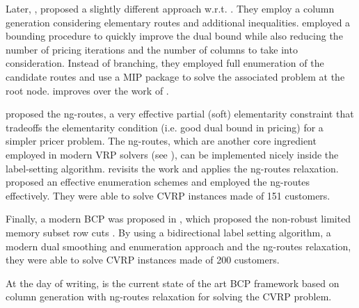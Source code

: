 Later, \textcite{baldacci2008}, proposed a slightly different approach w.r.t. \citeauthor{fukasawa2006}.
They employ a column generation considering elementary routes and additional inequalities.
\citeauthor{baldacci2008} employed a bounding procedure to quickly
improve the dual bound while also reducing the number
of pricing iterations and the number of columns to take into consideration.
Instead of branching, they employed full enumeration of the candidate
routes and use a MIP package to solve the associated problem at the root node.
\textcite{pessoa2008} improves over the work of \citeauthor{fukasawa2006}.

\textcite{baldacci2011} proposed the ng-routes, a very effective
partial (soft) elementarity constraint
that tradeoffs the elementarity condition (i.e. good dual bound in pricing)
for a simpler pricer problem.
The ng-routes,
which are another core ingredient employed in modern VRP solvers (see \cite{pessoa2020a}),
can be implemented nicely inside the label-setting algorithm.
\textcite{ropke2012} revisits the work \citeauthor{fukasawa2006} and applies
the ng-routes relaxation.
\textcite{contardo2014} proposed an effective enumeration schemes and employed the ng-routes effectively.
They were able to solve CVRP instances made of 151 customers.

Finally, a modern BCP was proposed in \textcite{pecin2017}, which
proposed the non-robust limited memory subset row cuts \parencite{pecin2017a}.
By using a bidirectional label setting algorithm, a modern dual smoothing and enumeration
approach and the ng-routes relaxation, they were able to solve CVRP
instances made of 200 customers.

At the day of writing, \textcite{pessoa2020a} is the current state of the
art BCP framework based on column generation with ng-routes relaxation
for solving the CVRP problem.






\begin{comment}
\cite{jepsen_branch-and-cut_2011}

Before 1980 very few exact algorithms for cvrp and vrptw had been
proposed, but in the early 1980s two new exact methods where proposed.
From this point the history of exact methods for cvrp and vrptw can
be divided into three phases. The first phase was the introduction of the
Set Partition and the development of Branch-and-Cut-and-Price (bp) algo-
rithms using a relaxed pricing problem. The second was the development of
Branch-and-Cut (bac) algorithms. In the current phase the pricing problem
is no longer relaxed and cuts in the master problem of the Branch-and-Cut-
and-Price algorithms is used. The first two phases where started at the same
point in time and there is still development on the algorithms in the context
of cvrp and vrptw. The algorithms from these two phases are also used
on several other variants of the Vehicle Routing Problem. The third phase
was started in the middle of the 2000s and the algorithms from this phase
are currently the best overall performing algorithms.
\end{comment}

